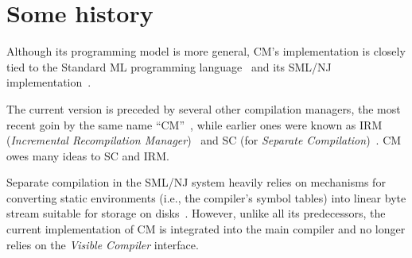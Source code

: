 \documentclass{article}
\begin{document}
\section{Some history}

Although its programming model is more general, CM's implementation is
closely tied to the Standard ML programming language~\cite{milner97}
and its SML/NJ implementation~\cite{appel91:sml}.

The current version is preceded by several other compilation managers,
the most recent goin by the same name ``CM''~\cite{blume95:cm}, while
earlier ones were known as IRM ({\it Incremental Recompilation
Manager})~\cite{harper94:irm} and SC (for {\it Separate
Compilation})~\cite{harper-lee-pfenning-rollins-CM}.  CM owes many
ideas to SC and IRM.

Separate compilation in the SML/NJ system heavily relies on mechanisms
for converting static environments (i.e., the compiler's symbol
tables) into linear byte stream suitable for storage on
disks~\cite{appel94:sepcomp}.  However, unlike all its predecessors,
the current implementation of CM is integrated into the main compiler
and no longer relies on the {\em Visible Compiler} interface.

\cleardoublepage

\tableofcontents

\pagebreak


\end{document}
